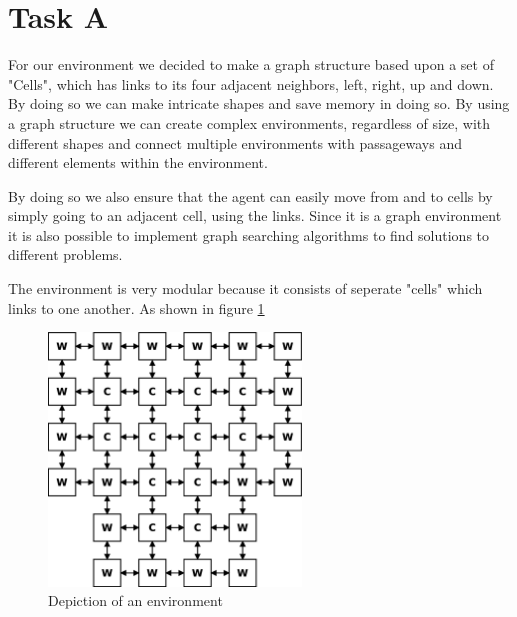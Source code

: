 
\section{Task A}
For our environment we decided to make a graph structure based upon a set of
"Cells", which has links to its four adjacent neighbors, left, right, up and 
down. By doing so we can make intricate shapes and save memory in doing so. By
using a graph structure we can create complex environments, regardless of size,
with different shapes and connect multiple environments with passageways and
different elements within the environment.

By doing so we also ensure that the agent can easily move from and to cells by
simply going to an adjacent cell, using the links.  Since it is a graph
environment it is also possible to implement graph searching algorithms to find
solutions to different problems.

The environment is very modular because it consists of seperate "cells" which
links to one another.  As shown in figure \ref{fig:env}

\begin{figure}[h] \label{fig:env}	\centering
\includegraphics[width=0.6\textwidth]{environment}
\caption{Depiction of an environment}
\end{figure}

